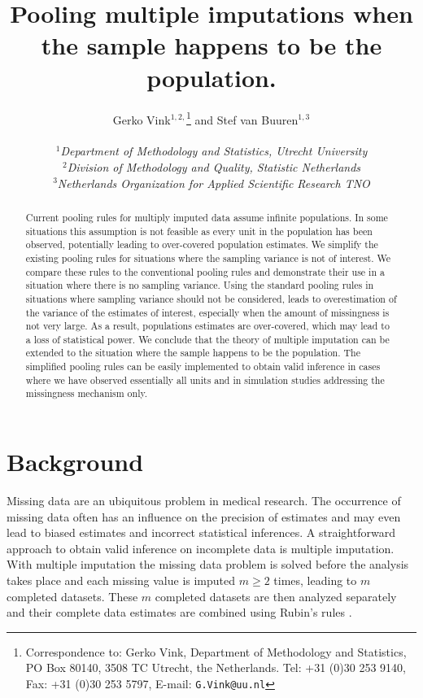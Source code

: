 \documentclass[12pt, a4paper]{article}
\begin{document}
\title{Pooling multiple imputations when the sample happens to be the population.}

\author{Gerko Vink$^{1,2,}$\thanks{Correspondence to: Gerko Vink, Department of Methodology and Statistics, PO Box 80140, 3508 TC Utrecht, the Netherlands. Tel: +31 (0)30 253 9140, Fax: +31 (0)30 253 5797, E-mail: \texttt{G.Vink@uu.nl}}\; and Stef van Buuren$^{1,3}$\\
\newline\\
\small{\textsl{$^1$Department of Methodology and Statistics, Utrecht University}}\\
\small{\textsl{$^2$Division of Methodology and Quality, Statistic Netherlands}}\\
\small{\textsl{$^3$Netherlands Organization for Applied Scientific Research TNO}}}
\date{}
\maketitle


\begin{abstract} %
Current pooling rules for multiply imputed data assume infinite populations. In some situations this assumption is not feasible as every unit in the population has been observed, potentially leading to over-covered population estimates. We simplify the existing pooling rules for situations where the sampling variance is not of interest. We compare these rules to the conventional pooling rules and demonstrate their use in a situation where there is no sampling variance. Using the standard pooling rules in situations where sampling variance should not be considered, leads to overestimation of the variance of the estimates of interest, especially when the amount of missingness is not very large. As a result, populations estimates are over-covered, which may lead to a loss of statistical power. We conclude that the theory of multiple imputation can be extended to the situation where the sample happens to be the population. The simplified pooling rules can be easily implemented to obtain valid inference in cases where we have observed essentially all units and in simulation studies addressing the missingness mechanism only.
\end{abstract}

\section{Background}
Missing data are an ubiquitous problem in medical research. The occurrence of missing data often has an influence on the precision of estimates and may even lead to biased estimates and incorrect statistical inferences. A straightforward approach to obtain valid inference on incomplete data is multiple imputation. With multiple imputation the missing data problem is solved before the analysis takes place and each missing value is imputed $m\geq2$ times, leading to $m$ completed datasets. These $m$ completed datasets are then analyzed separately and their complete data estimates are combined using Rubin's rules \citep{RubinD1987}. 
\end{document}
